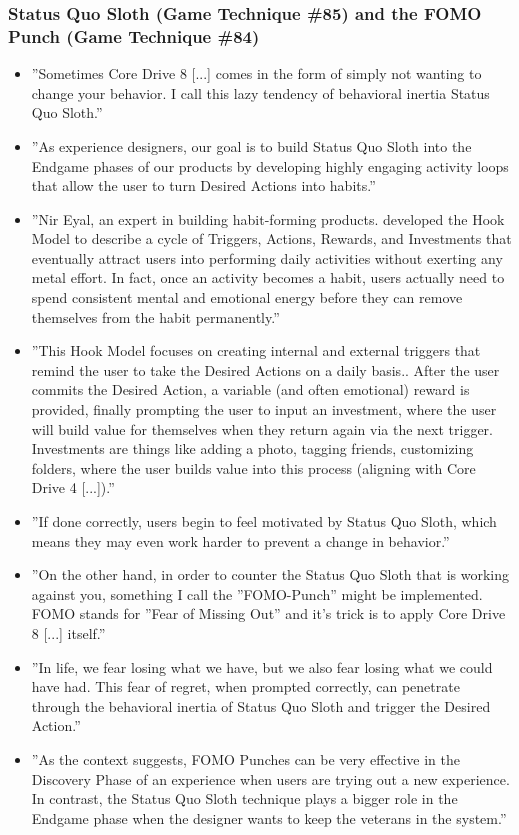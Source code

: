     \subsubsection{Status Quo Sloth (Game Technique \#85) and the FOMO Punch (Game Technique \#84)}
        \begin{itemize}
            \item ''Sometimes Core Drive 8 [...] comes in the form of simply not wanting to change your behavior. I call this lazy tendency of behavioral inertia Status Quo Sloth.''
            \item ''As experience designers, our goal is to build Status Quo Sloth into the Endgame phases of our products by developing highly engaging activity loops that allow the user to turn Desired Actions into habits.''
            \item ''Nir Eyal, an expert in building habit-forming products. developed the Hook Model to describe a cycle of Triggers, Actions, Rewards, and Investments that eventually attract users into performing daily activities without exerting any metal effort. In fact, once an activity becomes a habit, users actually need to spend consistent mental and emotional energy before they can remove themselves from the habit permanently.''
            \item ''This Hook Model focuses on creating internal and external triggers that remind the user to take the Desired Actions on a daily basis.. After the user commits the Desired Action, a variable (and often emotional) reward is provided, finally prompting the user to input an investment, where the user will build value for themselves when they return again via the next trigger. Investments are things like adding a photo, tagging friends, customizing folders, where the user builds value into this process (aligning with Core Drive 4 [...]).''
            \item ''If done correctly, users begin to feel motivated by Status Quo Sloth, which means they may even work harder to prevent a change in behavior.''
            \item ''On the other hand, in order to counter the Status Quo Sloth that is working against you, something I call the ''FOMO-Punch'' might be implemented. FOMO stands for ''Fear of Missing Out'' and it's trick is to apply Core Drive 8 [...] itself.''
            \item ''In life, we fear losing what we have, but we also fear losing what we could have had. This fear of regret, when prompted correctly, can penetrate through the behavioral inertia of Status Quo Sloth and trigger the Desired Action.''
            \item ''As the context suggests, FOMO Punches can be very effective in the Discovery Phase of an experience when users are trying out a new experience. In contrast, the Status Quo Sloth technique plays a bigger role in the Endgame phase when the designer wants to keep the veterans in the system.''
        \end{itemize}
        
